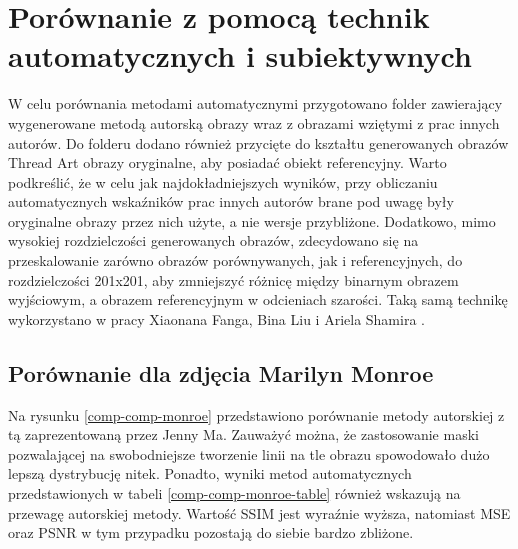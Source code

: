     \section{Porównanie z pomocą technik automatycznych i subiektywnych} \label{comp-comp}
    W celu porównania metodami automatycznymi przygotowano folder zawierający wygenerowane metodą autorską obrazy wraz z obrazami wziętymi z prac innych autorów. Do folderu dodano również przycięte do kształtu generowanych obrazów Thread Art obrazy oryginalne, aby posiadać obiekt referencyjny. Warto podkreślić, że w celu jak najdokładniejszych wyników, przy obliczaniu automatycznych wskaźników prac innych autorów brane pod uwagę były oryginalne obrazy przez nich użyte, a nie wersje przybliżone. Dodatkowo, mimo wysokiej rozdzielczości generowanych obrazów, zdecydowano się na przeskalowanie zarówno obrazów porównywanych, jak i referencyjnych, do rozdzielczości 201x201, aby zmniejszyć różnicę między binarnym obrazem wyjściowym, a obrazem referencyjnym w odcieniach szarości. Taką samą technikę wykorzystano w pracy Xiaonana Fanga, Bina Liu i Ariela Shamira \cite{article-string-art-xiaonan}.
    
        \subsection{Porównanie dla zdjęcia Marilyn Monroe}
    	Na rysunku \ref{comp-comp-monroe} przedstawiono porównanie metody autorskiej z tą zaprezentowaną przez Jenny Ma. Zauważyć można, że zastosowanie maski pozwalającej na swobodniejsze tworzenie linii na tle obrazu spowodowało dużo lepszą dystrybucję nitek. Ponadto, wyniki metod automatycznych przedstawionych w tabeli \ref{comp-comp-monroe-table} również wskazują na przewagę autorskiej metody. Wartość SSIM jest wyraźnie wyższa, natomiast MSE oraz PSNR w tym przypadku pozostają do siebie bardzo zbliżone.
    	
